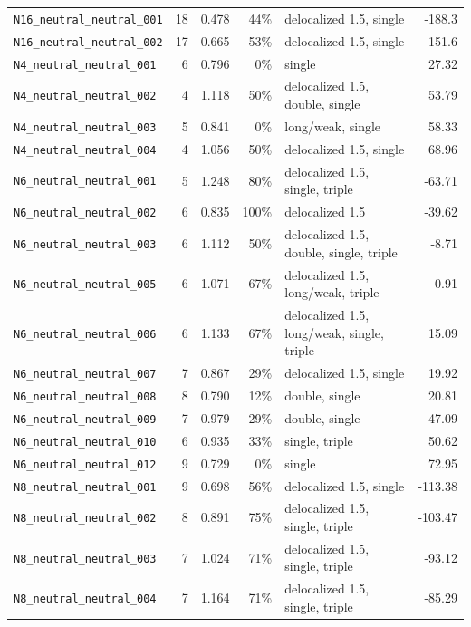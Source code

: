 {\begin{longtable}{@{}p{4.6cm}rrrp{2.4cm}r@{}}
\texttt{N16\_neutral\_neutral\_001} & 18 & 0.478 & 44\% & delocalized 1.5, single & -188.3 \\
\texttt{N16\_neutral\_neutral\_002} & 17 & 0.665 & 53\% & delocalized 1.5, single & -151.6 \\
\texttt{N4\_neutral\_neutral\_001} & 6 & 0.796 & 0\% & single & 27.32 \\
\texttt{N4\_neutral\_neutral\_002} & 4 & 1.118 & 50\% & delocalized 1.5, double, single & 53.79 \\
\texttt{N4\_neutral\_neutral\_003} & 5 & 0.841 & 0\% & long/weak, single & 58.33 \\
\texttt{N4\_neutral\_neutral\_004} & 4 & 1.056 & 50\% & delocalized 1.5, single & 68.96 \\
\texttt{N6\_neutral\_neutral\_001} & 5 & 1.248 & 80\% & delocalized 1.5, single, triple & -63.71 \\
\texttt{N6\_neutral\_neutral\_002} & 6 & 0.835 & 100\% & delocalized 1.5 & -39.62 \\
\texttt{N6\_neutral\_neutral\_003} & 6 & 1.112 & 50\% & delocalized 1.5, double, single, triple & -8.71 \\
\texttt{N6\_neutral\_neutral\_005} & 6 & 1.071 & 67\% & delocalized 1.5, long/weak, triple & 0.91 \\
\texttt{N6\_neutral\_neutral\_006} & 6 & 1.133 & 67\% & delocalized 1.5, long/weak, single, triple & 15.09 \\
\texttt{N6\_neutral\_neutral\_007} & 7 & 0.867 & 29\% & delocalized 1.5, single & 19.92 \\
\texttt{N6\_neutral\_neutral\_008} & 8 & 0.790 & 12\% & double, single & 20.81 \\
\texttt{N6\_neutral\_neutral\_009} & 7 & 0.979 & 29\% & double, single & 47.09 \\
\texttt{N6\_neutral\_neutral\_010} & 6 & 0.935 & 33\% & single, triple & 50.62 \\
\texttt{N6\_neutral\_neutral\_012} & 9 & 0.729 & 0\% & single & 72.95 \\
\texttt{N8\_neutral\_neutral\_001} & 9 & 0.698 & 56\% & delocalized 1.5, single & -113.38 \\
\texttt{N8\_neutral\_neutral\_002} & 8 & 0.891 & 75\% & delocalized 1.5, single, triple & -103.47 \\
\texttt{N8\_neutral\_neutral\_003} & 7 & 1.024 & 71\% & delocalized 1.5, single, triple & -93.12 \\
\texttt{N8\_neutral\_neutral\_004} & 7 & 1.164 & 71\% & delocalized 1.5, single, triple & -85.29 \\

\end{longtable}}
